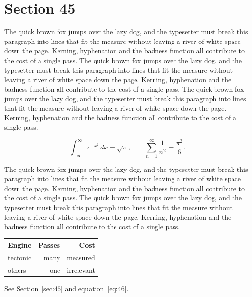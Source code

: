 \documentclass{article}
\begin{document}
\section{Section 45}
\label{sec:45}
The quick brown fox jumps over the lazy dog, and the typesetter must break this paragraph into lines that fit the measure without leaving a river of white space down the page. Kerning, hyphenation and the badness function all contribute to the cost of a single pass. The quick brown fox jumps over the lazy dog, and the typesetter must break this paragraph into lines that fit the measure without leaving a river of white space down the page. Kerning, hyphenation and the badness function all contribute to the cost of a single pass. The quick brown fox jumps over the lazy dog, and the typesetter must break this paragraph into lines that fit the measure without leaving a river of white space down the page. Kerning, hyphenation and the badness function all contribute to the cost of a single pass. 

\begin{equation}\label{eq:45}
\int_{-\infty}^{\infty} e^{-x^{2}}\,dx = \sqrt{\pi}, \qquad
\sum_{n=1}^{\infty} \frac{1}{n^{2}} = \frac{\pi^{2}}{6}.
\end{equation}

The quick brown fox jumps over the lazy dog, and the typesetter must break this paragraph into lines that fit the measure without leaving a river of white space down the page. Kerning, hyphenation and the badness function all contribute to the cost of a single pass. The quick brown fox jumps over the lazy dog, and the typesetter must break this paragraph into lines that fit the measure without leaving a river of white space down the page. Kerning, hyphenation and the badness function all contribute to the cost of a single pass. 

\begin{center}
\begin{tabular}{lrr}
\toprule
Engine & Passes & Cost \\
\midrule
tectonic & many & measured \\
others & one & irrelevant \\
\bottomrule
\end{tabular}
\end{center}

See Section~\ref{sec:46} and equation~\eqref{eq:46}.
\end{document}
